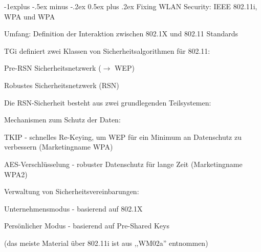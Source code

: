 \documentclass[a4paper]{article}
\makeatletter
\renewcommand{\subsection}{\@startsection{subsection}{2}{0mm}%
 {-1explus -.5ex minus -.2ex}%
 {0.5ex plus .2ex}%
 {\normalfont\normalsize\bfseries}}
\makeatother
\begin{document}
\begin{multicols}{3}
      \subsection{Fixing WLAN Security: IEEE 802.11i, WPA und WPA}
      \begin{itemize*}
            \item Umfang: Definition der Interaktion zwischen 802.1X und 802.11 Standards
            \item TGi definiert zwei Klassen von Sicherheitsalgorithmen für 802.11:
            \begin{itemize*}
                  \item Pre-RSN Sicherheitsnetzwerk ($\rightarrow$ WEP)
                  \item Robustes Sicherheitsnetzwerk (RSN)
            \end{itemize*}
            \item Die RSN-Sicherheit besteht aus zwei grundlegenden Teilsystemen:
            \begin{itemize*}
                  \item Mechanismen zum Schutz der Daten:
                  \begin{itemize*}
                        \item TKIP - schnelles Re-Keying, um WEP für ein Minimum an Datenschutz zu verbessern (Marketingname WPA)
                        \item AES-Verschlüsselung - robuster Datenschutz für lange Zeit (Marketingname WPA2)
                  \end{itemize*}
            \end{itemize*}
            \item Verwaltung von Sicherheitsvereinbarungen:
            \begin{itemize*}
                  \item Unternehmensmodus - basierend auf 802.1X
                  \item Persönlicher Modus - basierend auf Pre-Shared Keys
            \end{itemize*}
      \end{itemize*}
      (das meiste Material über 802.11i ist aus ,,WM02a'' entnommen)


\end{multicols}
\end{document}
